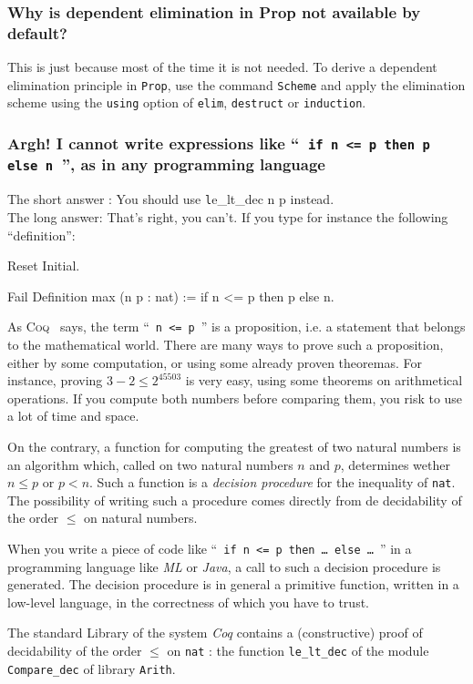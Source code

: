 \documentclass[a4paper,pdftex]{article}
\def\Question#1{\stepcounter{question}\subsubsection{#1}}
\def\Coq{\textsc{Coq}}
\begin{document}
\Question{Why is dependent elimination in Prop not
available by default?}

 
This is just because most of the time it is not needed. To derive a
dependent elimination principle in {\tt Prop}, use the command {\tt Scheme} and
apply the elimination scheme using the \verb=using= option of
\verb=elim=, \verb=destruct= or \verb=induction=.


\Question{Argh! I cannot write expressions like ``~{\tt if n <= p then p else n}~'', as in any programming language}
\label{minmax}

The short answer : You should use {\texttt le\_lt\_dec n p} instead.\\

The long answer: That's right, you can't.
If you type for instance the following ``definition'':
\begin{coq_eval}
Reset Initial.
\end{coq_eval}
\begin{coq_example}
Fail Definition max (n p : nat) := if n <= p then p else n.
\end{coq_example}

As \Coq~ says, the term ``~\texttt{n <= p}~'' is a proposition, i.e. a
statement that belongs to the mathematical world. There are many ways to
prove such a proposition, either by some computation, or using some already
proven theoremas. For instance, proving $3-2 \leq 2^{45503}$ is very easy,
using some theorems on arithmetical operations. If you compute both numbers
before comparing them, you risk to use a lot of time and space.


On the contrary, a function for computing the greatest of two natural numbers
is an algorithm  which, called on two natural numbers
$n$ and $p$, determines wether $n\leq p$ or $p < n$.
Such a function is a \emph{decision  procedure} for the inequality of
 \texttt{nat}.  The possibility of writing such a procedure comes 
directly from de decidability of the order $\leq$ on natural numbers.


When you write a piece of code like 
``~\texttt{if n <= p then \dots{} else \dots}~''
in a
programming language like \emph{ML} or \emph{Java}, a call to such a 
decision procedure is generated. The decision procedure is in general
a primitive function, written in a low-level language, in the correctness
of which you have to trust.

The standard Library of the system \emph{Coq} contains a  
(constructive) proof of decidability of the order $\leq$ on
\texttt{nat} : the function \texttt{le\_lt\_dec} of 
the module \texttt{Compare\_dec} of library \texttt{Arith}.
\end{document}
